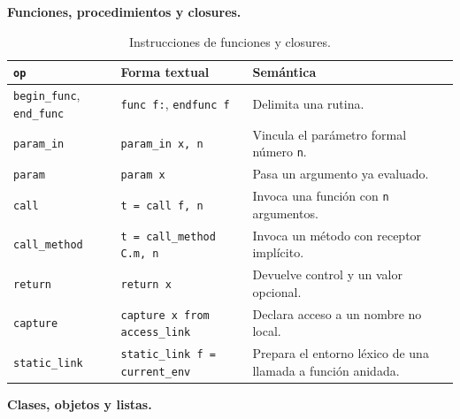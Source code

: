 \documentclass[11pt,a4paper]{article}
\newcommand{\subhead}[1]{\par\medskip\noindent\textbf{#1}\par\nopagebreak\smallskip}
\begin{document}
\subhead{Funciones, procedimientos y closures.}

\begin{table}[H]
\centering
\small
\begin{tabular}{@{}L{3.1cm}L{4.6cm}L{6.7cm}@{}}
\toprule
\textbf{\texttt{op}} & \textbf{Forma textual} & \textbf{Semántica} \\
\midrule
\texttt{begin\_func}, \texttt{end\_func} & \texttt{func f:}, \texttt{endfunc f} &
Delimita una rutina. \\
\texttt{param\_in} & \texttt{param\_in x, n} & Vincula el parámetro formal
número \texttt{n}. \\
\texttt{param} & \texttt{param x} & Pasa un argumento ya evaluado. \\
\texttt{call} & \texttt{t = call f, n} & Invoca una función con \texttt{n}
argumentos. \\
\texttt{call\_method} & \texttt{t = call\_method C.m, n} & Invoca un método con
receptor implícito. \\
\texttt{return} & \texttt{return x} & Devuelve control y un valor opcional. \\
\texttt{capture} & \texttt{capture x from access\_link} & Declara acceso a un
nombre no local. \\
\texttt{static\_link} & \texttt{static\_link f = current\_env} & Prepara el
entorno léxico de una llamada a función anidada. \\
\bottomrule
\end{tabular}
\caption{Instrucciones de funciones y closures.}
\end{table}

\subhead{Clases, objetos y listas.}
\end{document}
